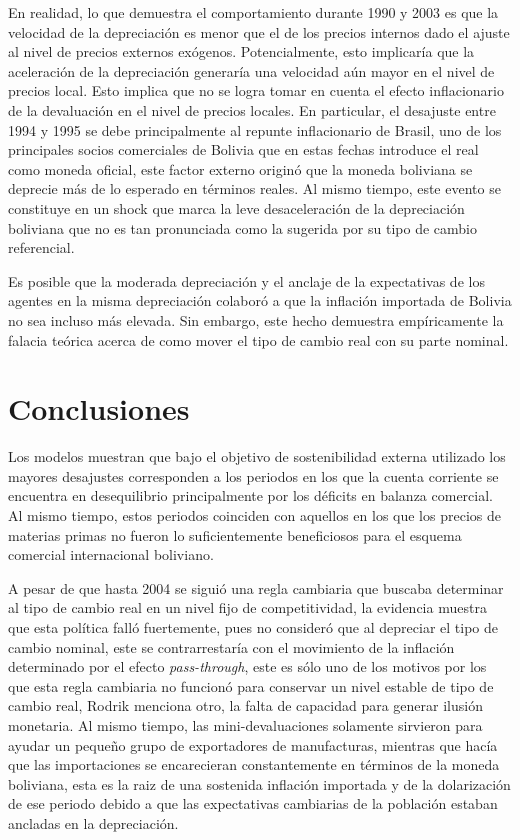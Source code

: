 \documentclass[12pt,letterpaper]{article}
\begin{document}
En realidad, lo que demuestra el comportamiento durante 1990 y 2003 es que la velocidad de la depreciación es menor que el de los precios internos dado el ajuste al nivel de precios externos exógenos. Potencialmente, esto implicaría que la aceleración de la depreciación generaría una velocidad aún mayor en el nivel de precios local. Esto implica que no se logra tomar en cuenta el efecto inflacionario de la devaluación en el nivel de precios locales. En particular, el desajuste entre 1994 y 1995 se debe principalmente al repunte inflacionario de Brasil, uno de los principales socios comerciales de Bolivia que en estas fechas introduce el real como moneda oficial, este factor externo originó que la moneda boliviana se deprecie más de lo esperado en términos reales. Al mismo tiempo, este evento se constituye en un shock que marca la leve desaceleración de la depreciación boliviana que no es tan pronunciada como la sugerida por su tipo de cambio referencial.

Es posible que la moderada depreciación y el anclaje de la expectativas de los agentes en la misma depreciación colaboró a que la inflación importada de Bolivia no sea incluso más elevada. Sin embargo, este hecho demuestra empíricamente la falacia teórica acerca de como mover el tipo de cambio real con su parte nominal.











\section{Conclusiones}\label{concl}

Los modelos muestran que bajo el objetivo de sostenibilidad externa utilizado los mayores desajustes corresponden a los periodos en los que la cuenta corriente se encuentra en desequilibrio principalmente por los déficits en balanza comercial. Al mismo tiempo, estos periodos coinciden con aquellos en los que los precios de materias primas no fueron lo suficientemente beneficiosos para el esquema comercial internacional boliviano.

A pesar de que hasta 2004 se siguió una regla cambiaria que buscaba determinar al tipo de cambio real en un nivel fijo de competitividad, la evidencia muestra que esta política falló fuertemente, pues no consideró que al depreciar el tipo de cambio nominal, este se contrarrestaría con el movimiento de la inflación determinado por el efecto \emph{pass-through}, este es sólo uno de los motivos por los que esta regla cambiaria no funcionó para conservar un nivel estable de tipo de cambio real, Rodrik menciona otro, la falta de capacidad para generar ilusión monetaria. Al mismo tiempo, las mini-devaluaciones solamente sirvieron para ayudar un pequeño grupo de exportadores de manufacturas, mientras que hacía que las importaciones se encarecieran constantemente en términos de la moneda boliviana, esta es la raiz de una sostenida inflación importada y de la dolarización de ese periodo debido a que las expectativas cambiarias de la población estaban ancladas en la depreciación.
\end{document}
